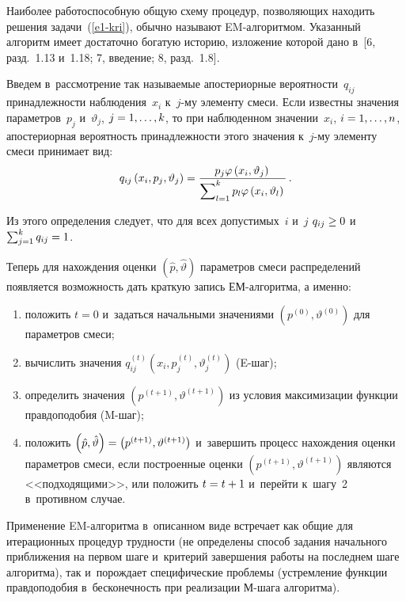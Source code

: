 \begin{multicols}{2}
     \vspace*{-4pt}

     Наиболее работоспособную общую схему процедур, позволяющих
находить решения задачи~(\ref{e1-kri}), обычно называют EM-ал\-го\-рит\-мом.
Указанный алгоритм имеет достаточно богатую историю, изложение которой
дано в~[6, разд.~1.13 и~1.18; 7, введение; 8, разд.~1.8].

     Введем в~рассмотрение так называемые апостериорные
вероятности~$q_{ij}$ принадлежности наблюдения~$x_i$ к~$j$-му элементу
смеси. Если известны значения параметров~$p_j$ и~$\vartheta_j$, $j\hm=
1,\ldots ,k$, то при наблюденном значении~$x_i$, $i\hm= 1,\ldots, n$,
апостериорная вероятность принадлежности этого значения к~$j$-му элементу
смеси принимает вид:
     $$
     q_{ij}\left( x_i,p_j,\vartheta_j\right) = \displaystyle\frac{\displaystyle p_j\varphi\left(
x_i,\vartheta_j\right)\mathstrut}{\displaystyle \sum\nolimits_{l=1}^k p_l \varphi\left(x_i,\vartheta_l\right)\mathstrut}\,.
     $$

     Из этого определения следует, что для всех допустимых~$i$ и~$j$
$q_{ij}\hm\geq 0$ и~$\sum\nolimits_{j=1}^k q_{ij} \hm=1$.

     Теперь для нахождения оценки $\left( \hat{p},\hat{\vartheta}\right)$
па\-ра\-мет\-ров смеси распределений появляется возможность дать краткую запись
ЕМ-ал\-го\-рит\-ма, а именно:

\columnbreak
     \begin{enumerate}[(1)]
\item положить $t=0$ и~задаться начальными значениями $\left(
p^{(0)},\vartheta^{(0)}\right)$ для параметров смеси;
\item вычислить значения $q_{ij}^{(t)}\left( x_i, p_j^{(t)},
\vartheta_j^{(t)}\right)$ (\mbox{E-шаг});
\item определить значения $\left( p^{(t+1)},\vartheta^{(t+1)}\right)$ из
условия максимизации функции правдоподобия (\mbox{M-шаг});
\item положить $\left( \hat{p},\hat{\vartheta}\right)\hm= \left( p^{(t+1)},
\vartheta^{(t+1)}\right)$ и~завершить процесс нахождения оценки параметров
смеси, если построенные оценки $\left( p^{(t+1)},\vartheta^{(t+1)}\right)$
являются <<подходящими>>, или положить $t\hm= t\hm+1$ и~перейти к~шагу~2
 в~противном случае. %
\end{enumerate}

     Применение EM-ал\-го\-рит\-ма в~описанном виде встречает как общие
для итерационных процедур трудности (не определены способ задания
начального приближения на первом шаге и~критерий завершения работы на
последнем шаге алгоритма), так и~порождает специфические проблемы
(устремление функции правдоподобия в~бесконечность при реализации
     М-ша\-га алгоритма).


\end{multicols}
